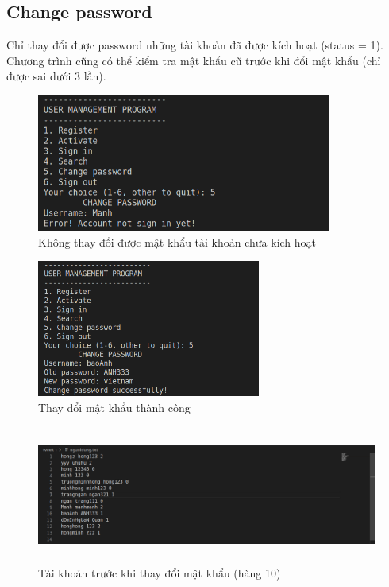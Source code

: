 \documentclass[12pt]{article}
\begin{document}
\subsection{Change password}
Chỉ thay đổi được password những tài khoản đã được kích hoạt (status = 1). Chương trình cũng có thể kiểm tra mật khẩu cũ trước khi đổi mật khẩu (chỉ được sai dưới 3 lần).
\begin{figure}[!htb]
    \begin{center}
        \includegraphics[width=0.8\linewidth, height=4.5cm]{Img/5fail.png}
    \end{center}
    \caption{Không thay đổi được mật khẩu tài khoản chưa kích hoạt}
    \label{fig:5_khoa}
\end{figure}
\begin{figure}[!htb]
    \begin{center}
        \includegraphics[width=0.8\linewidth, height=4.5cm]{Img/5suc.png}
    \end{center}
    \caption{Thay đổi mật khẩu thành công}
    \label{fig:5_suc}
\end{figure}
\begin{figure}[!htb]
    \begin{center}
        \includegraphics[width=0.8\linewidth, height=4.5cm]{Img/Truockhikhoa.png}
    \end{center}
    \caption{Tài khoản trước khi thay đổi mật khẩu (hàng 10)}
    \label{fig:5_akhoa}
\end{figure}
\end{document}
